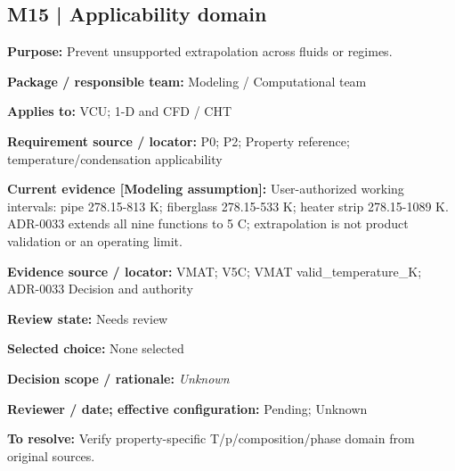 \documentclass[11pt]{article}
\begin{document}
\par\noindent\begin{minipage}{\textwidth}\small\setlength{\parskip}{2pt}
\subsection*{M15 | Applicability domain}
\textbf{Purpose:} Prevent unsupported extrapolation across fluids or regimes.\par
\textbf{Package / responsible team:} Modeling / Computational team\par
\textbf{Applies to:} VCU; 1-D and CFD / CHT\par
\textbf{Requirement source / locator:} P0; P2; Property reference; temperature/condensation applicability\par
\textbf{Current evidence [Modeling assumption]:} User-authorized working intervals: pipe 278.15-813 K; fiberglass 278.15-533 K; heater strip 278.15-1089 K. ADR-0033 extends all nine functions to 5 C; extrapolation is not product validation or an operating limit.\par
\textbf{Evidence source / locator:} VMAT; V5C; VMAT valid\_\allowbreak{}temperature\_\allowbreak{}K; ADR-0033 Decision and authority\par
\textbf{Review state:} Needs review\par
\textbf{Selected choice:} None selected\par
\textbf{Decision scope / rationale:} \textit{Unknown}\par
\textbf{Reviewer / date; effective configuration:} Pending; Unknown\par
\textbf{To resolve:} Verify property-specific T/p/composition/phase domain from original sources.\par
\end{minipage}\par\vspace{5pt}
\end{document}
